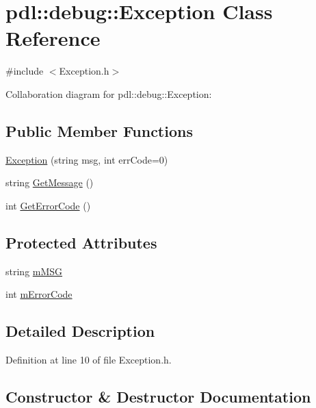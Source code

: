\hypertarget{classpdl_1_1debug_1_1_exception}{}\section{pdl\+::debug\+::Exception Class Reference}
\label{classpdl_1_1debug_1_1_exception}


{\ttfamily \#include $<$Exception.\+h$>$}



Collaboration diagram for pdl\+::debug\+::Exception\+:
\subsection*{Public Member Functions}
\begin{DoxyCompactItemize}
\item 
\mbox{\hyperlink{classpdl_1_1debug_1_1_exception_a1a7ab298af60424c50d0ad8a8b35e6d6}{Exception}} (string msg, int err\+Code=0)
\item 
string \mbox{\hyperlink{classpdl_1_1debug_1_1_exception_a642cd3b32b4a990c5f6b0e01d99b633b}{Get\+Message}} ()
\item 
int \mbox{\hyperlink{classpdl_1_1debug_1_1_exception_a11172b1eb57526050c9f1c47e7ccce1a}{Get\+Error\+Code}} ()
\end{DoxyCompactItemize}
\subsection*{Protected Attributes}
\begin{DoxyCompactItemize}
\item 
string \mbox{\hyperlink{classpdl_1_1debug_1_1_exception_a66c86b5f3835f41fc953c1bae576d39c}{m\+M\+SG}}
\item 
int \mbox{\hyperlink{classpdl_1_1debug_1_1_exception_a747e05300740d6f7dc0ddd729a3e07d7}{m\+Error\+Code}}
\end{DoxyCompactItemize}


\subsection{Detailed Description}


Definition at line 10 of file Exception.\+h.



\subsection{Constructor \& Destructor Documentation}
\mbox{\label{classpdl_1_1debug_1_1_exception_a1a7ab298af60424c50d0ad8a8b35e6d6}} 

